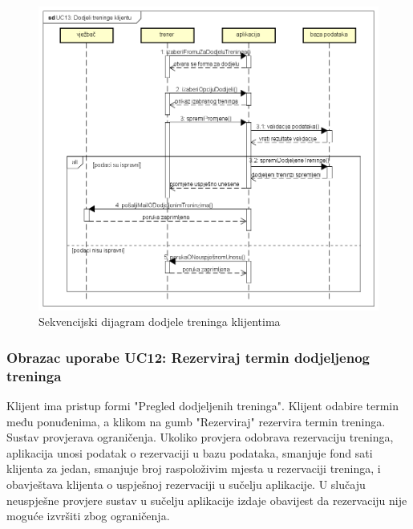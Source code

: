                 \begin{figure}[H]
		              \includegraphics[scale=0.6]{./Dijagrami/UC13_Dodjeli_treninge_klijentu.png}
		              \centering
		              \caption{Sekvencijski dijagram dodjele treninga klijentima}
		              \label{fig:promjene}
	            \end{figure}

             
                \subsubsection{Obrazac uporabe UC12: Rezerviraj termin dodjeljenog treninga}
				\noindent Klijent ima pristup formi "Pregled dodjeljenih treninga". Klijent odabire termin među ponuđenima, a klikom na gumb "Rezerviraj" rezervira termin treninga. Sustav provjerava ograničenja. Ukoliko provjera odobrava rezervaciju treninga, aplikacija unosi podatak o rezervaciji u bazu podataka, smanjuje fond sati klijenta za jedan, smanjuje broj raspoloživim mjesta u rezervaciji treninga, i obavještava klijenta o uspješnoj rezervaciji u sučelju aplikacije. U slučaju neuspješne provjere sustav u sučelju aplikacije izdaje obavijest da rezervaciju nije moguće izvršiti zbog ograničenja.

